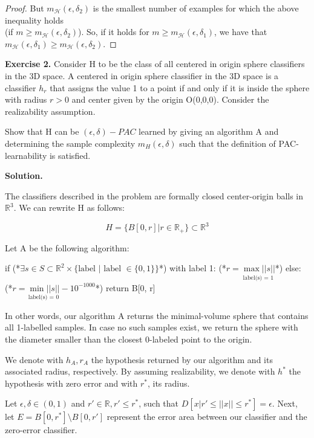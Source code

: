 \documentclass{article}
\newcommand{\<}{\langle}
\renewcommand{\>}{\rangle}
\theoremstyle{definition}
\def\gH{{\mathcal{H}}}
\newcommand{\mgh}{m_{\gH}}
\newcommand{\mgh}{m_{\gH}}
\begin{document}
\begin{enumerate}[label=\alph*)]
\begin{proof}
  But $\mgh(\epsilon, \delta_2)$ is the smallest number of examples for which the above
  inequality holds\\(if ${m \geq \mgh(\epsilon, \delta_2)}$). So, if it holds for
  $m \geq \mgh(\epsilon, \delta_1)$, we have that
  $\mgh(\epsilon, \delta_1) \geq \mgh(\epsilon, \delta_2)$.
  \end{proof}
\end{enumerate}

\textbf{Exercise 2.} Consider H to be the class of all centered in origin sphere classifiers in the 3D space. A centered in origin sphere classifier in the 3D space is a classifier $h_r$ that assigns the value 1 to a point if and only if it is inside the sphere with radius $r > 0$ and center given by the origin O(0,0,0). Consider the realizability assumption. 

Show that H can be $(\epsilon, \delta)-PAC$ learned by giving an algorithm A and determining the sample complexity $m_H (\epsilon, \delta)$ such that the definition of PAC-learnability is satisfied.

\newpage

\textbf{Solution.}

The classifiers described in the problem are formally closed center-origin balls in $\mathbb{R}^3$. We can rewrite H as follows:

$$H = \{ B[0, r] | r \in \mathbb{R}_{+}\} \subset \mathbb{R}^3$$

Let A be the following algorithm:

\begin{mylisting}
if (*$\exists s \in S \subset \mathbb{R}^2 \times \{\text{label } | \text{ label } \in \{0,1\} \}$*) with label 1:
    (*$r = \underset{\text{label(s) = 1} }{\max ||s||}$*)
else:
    (*$r = \underset{\text{label(s) = 0}}{\min ||s||} - 10^{-1000} $*)
return B[0, r]
\end{mylisting}

In other words, our algorithm A returns the minimal-volume sphere that contains all 1-labelled samples. In case no such samples exist, we return the sphere with the diameter smaller than the closest 0-labeled point to the origin.

We denote with $h_A, r_A$ the hypothesis returned by our algorithm and its associated radius, respectively. By assuming realizability, we denote with $h^*$ the hypothesis with zero error and with $r^*$, its radius. 

Let $\epsilon, \delta \in (0,1)$ and $r' \in \mathbb{R}, r' \leq r^*$, such that $D[{x|r' \leq ||x|| \leq r^*}] = \epsilon$. Next, let $E=B[0, r^*] \setminus B[0, r']$ represent the error area between our classifier and the zero-error classifier. 
\end{document}
